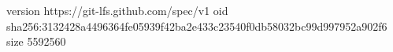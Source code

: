 version https://git-lfs.github.com/spec/v1
oid sha256:3132428a4496364fe05939f42ba2e433c23540f0db58032bc99d997952a902f6
size 5592560
